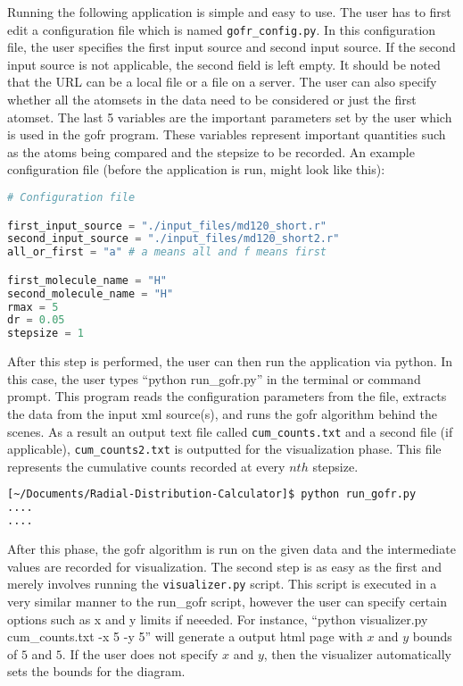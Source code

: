 Running the following application is simple and easy to use. The user has to first edit a configuration file which is named \verb|gofr_config.py|. In this configuration file, the user specifies the first input source and second input source. If the second input source is not applicable, the second field is left empty. It should be noted that the URL can be a local file or a file on a server. The user can also specify whether all the atomsets in the data need to be considered or just the first atomset. The last 5 variables are the important parameters set by the user which is used in the gofr program. These variables represent important quantities such as the atoms being compared and the stepsize to be recorded. An example configuration file (before the application is run, might look like this):

\begin{lstlisting}[language=Python, caption=Config file for setting parameters before the run.]
# Configuration file

first_input_source = "./input_files/md120_short.r"
second_input_source = "./input_files/md120_short2.r"
all_or_first = "a" # a means all and f means first

first_molecule_name = "H"
second_molecule_name = "H"
rmax = 5
dr = 0.05
stepsize = 1
\end{lstlisting}


After this step is performed, the user can then run the application via python. In this case, the user types ``python run_gofr.py'' in the terminal or command prompt. This program reads the configuration parameters from the file, extracts the data from the input xml source(s), and runs the gofr algorithm behind the scenes. As a result an output text file called \verb|cum_counts.txt| and a second file (if applicable), \verb|cum_counts2.txt| is outputted for the visualization phase. This file represents the cumulative counts recorded at every $nth$ stepsize. 


\begin{lstlisting}[language=bash, caption=Running the script.]
[~/Documents/Radial-Distribution-Calculator]$ python run_gofr.py
....
....
\end{lstlisting}

After this phase, the gofr algorithm is run on the given data and the intermediate values are recorded for visualization. The second step is as easy as the first and merely involves running the \verb|visualizer.py| script. This script is executed in a very similar manner to the run_gofr script, however the user can specify certain options such as x and y limits if neeeded. For instance, ``python visualizer.py cum_counts.txt -x 5 -y 5'' will generate a output html page with $x$ and $y$ bounds of $5$ and $5$. If the user does not specify $x$ and $y$, then the visualizer automatically sets the bounds for the diagram.

